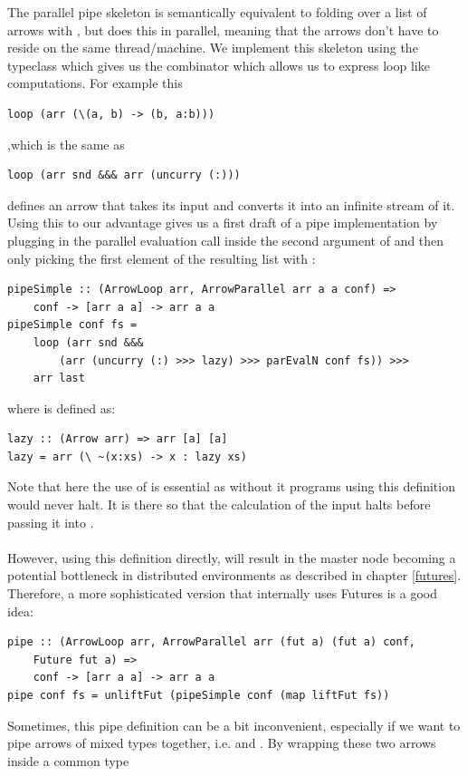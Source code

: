 The parallel pipe skeleton is semantically equivalent to folding over a list \code{[arr a a]} of arrows with \code{>>>}, but does this in parallel, meaning that the arrows don't have to reside on the same thread/machine. We implement this skeleton using the  typeclass which gives us the  combinator which allows us to express loop like computations. For example this
\begin{lstlisting}[frame=htrbl]
loop (arr (\(a, b) -> (b, a:b)))
\end{lstlisting}
,which is the same as
\begin{lstlisting}[frame=htrbl]
loop (arr snd &&& arr (uncurry (:)))
\end{lstlisting}
defines an arrow that takes its input  and converts it into an infinite stream \code{[a]} of it. Using this to our advantage gives us a first draft of a pipe implementation by plugging in the parallel evaluation call  inside the second argument of \code{&&&} and then only picking the first element of the resulting list with :
\begin{lstlisting}[frame=htrbl]
pipeSimple :: (ArrowLoop arr, ArrowParallel arr a a conf) =>
	conf -> [arr a a] -> arr a a
pipeSimple conf fs =
	loop (arr snd &&&
		(arr (uncurry (:) >>> lazy) >>> parEvalN conf fs)) >>>
	arr last
\end{lstlisting}
where  is defined as:
\begin{lstlisting}[frame=htrbl]
lazy :: (Arrow arr) => arr [a] [a]
lazy = arr (\ ~(x:xs) -> x : lazy xs)
\end{lstlisting}
Note that here the use of  is essential as without it programs using this definition would never halt. It is there so that the calculation of the input \code{[a]} halts before passing it into .
\\\\
However, using this definition directly, will result in the master node becoming a potential bottleneck in distributed environments as described in chapter \ref{futures}. Therefore, a more sophisticated version that internally uses Futures is a good idea:
\begin{lstlisting}[frame=htrbl]
pipe :: (ArrowLoop arr, ArrowParallel arr (fut a) (fut a) conf,
	Future fut a) =>
	conf -> [arr a a] -> arr a a
pipe conf fs = unliftFut (pipeSimple conf (map liftFut fs))
\end{lstlisting}
Sometimes, this pipe definition can be a bit inconvenient, especially if we want to pipe arrows of mixed types together, i.e.  and . By wrapping these two arrows inside a common type
